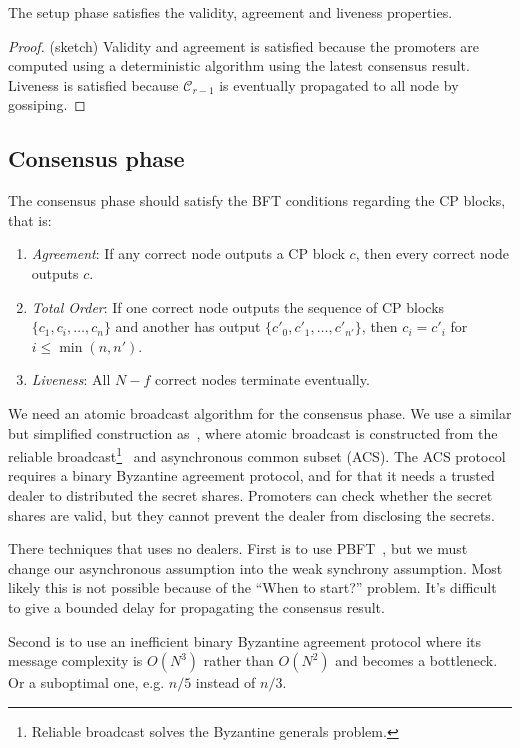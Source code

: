 \begin{corollary}
  The setup phase satisfies the validity, agreement and liveness properties.
\end{corollary}
\begin{proof}
  (sketch) Validity and agreement is satisfied because the promoters are
  computed using a deterministic algorithm using the latest consensus result.
  Liveness is satisfied because $\mathcal{C}_{r-1}$ is eventually propagated to
  all node by gossiping.
\end{proof}

\subsection{Consensus phase}
The consensus phase should satisfy the BFT conditions regarding the CP blocks,
that is:
\begin{enumerate}
\item \emph{Agreement}: If any correct node outputs a CP block $c$, then every
  correct node outputs $c$.
\item \emph{Total Order}: If one correct node outputs the sequence of CP blocks
  $\{c_1, c_i, \dots, c_n\}$ and another has output $\{c'_0, c'_1, \dots,
  c'_{n'} \}$, then $c_i = c'_i$ for $i \le \min(n, n')$.
\item \emph{Liveness}: All $N - f$ correct nodes terminate eventually.
\end{enumerate}

We need an atomic broadcast algorithm for the consensus phase. We use a similar
but simplified construction as~\cite{miller2016honey}, where atomic broadcast is
constructed from the reliable broadcast\footnote{Reliable broadcast solves the
  Byzantine generals problem.}~\cite{bracha1984asynchronous} and asynchronous
common subset (ACS). The ACS protocol requires a binary Byzantine agreement
protocol, and for that it needs a trusted dealer to distributed the secret
shares. Promoters can check whether the secret shares are valid, but they cannot
prevent the dealer from disclosing the secrets.

There techniques that uses no dealers. First is to use
PBFT~\cite{castro1999practical}, but we must change our asynchronous assumption
into the weak synchrony assumption. Most likely this is not possible because of
the ``When to start?'' problem. It's difficult to give a bounded delay for
propagating the consensus result.

Second is to use an inefficient binary Byzantine agreement protocol where its
message complexity is $O(N^3)$ rather than $O(N^2)$ and becomes a bottleneck. Or
a suboptimal one, e.g. $n/5$ instead of $n/3$.

